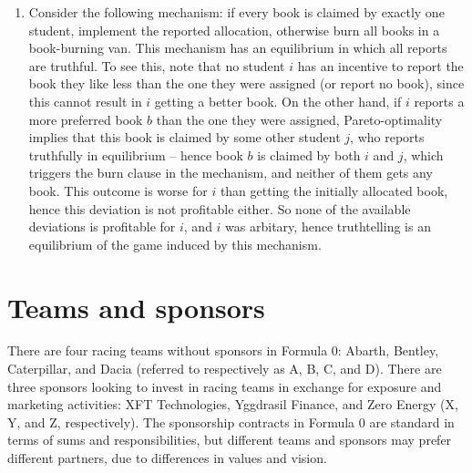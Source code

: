\documentclass[a4paper]{article}
\begin{document}
\begin{enumerate}
	\item Consider the following mechanism: if every book is claimed by exactly one student, implement the reported allocation, otherwise burn all books in a book-burning van. This mechanism has an equilibrium in which all reports are truthful. To see this, note that no student $i$ has an incentive to report the book they like less than the one they were assigned (or report no book), since this cannot result in $i$ getting a better book. On the other hand, if $i$ reports a more preferred book $b$ than the one they were assigned, Pareto-optimality implies that this book is claimed by some other student $j$, who reports truthfully in equilibrium -- hence book $b$ is claimed by both $i$ and $j$, which triggers the burn clause in the mechanism, and neither of them gets any book. This outcome is worse for $i$ than getting the initially allocated book, hence this deviation is not profitable either. So none of the available deviations is profitable for $i$, and $i$ was arbitary, hence truthtelling is an equilibrium of the game induced by this mechanism.
\end{enumerate}
\fi



\section{Teams and sponsors}
There are four racing teams without sponsors in Formula 0: Abarth,
Bentley, Caterpillar, and Dacia (referred to respectively as A, B, C,
and D). There are three sponsors looking to invest in racing teams in
exchange for exposure and marketing activities: XFT Technologies,
Yggdrasil Finance, and Zero Energy (X, Y, and Z, respectively).
The sponsorship contracts in Formula 0 are standard in terms of sums and
responsibilities, but different teams and sponsors may prefer different
partners, due to differences in values and vision.
\end{document}
